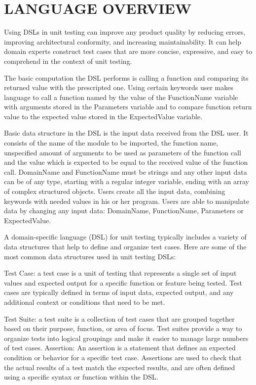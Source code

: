 \chapter{LANGUAGE OVERVIEW}

Using DSLs in unit testing can improve any product quality by reducing errors, improving architectural conformity, and increasing maintainability. It can help domain experts construct test cases that are more concise, expressive, and easy to comprehend in the context of unit testing.

The basic computation the DSL performs is calling a function and comparing its returned value with the prescripted one. Using certain keywords user makes language to call a function named by the value of the FunctionName variable with arguments stored in the Parameters variable and to compare function return value to the expected value stored in the ExpectedValue variable.

Basic data structure in the DSL is the input data received from the DSL user. It consists of the name of the module to be imported, the function name, unspecified amount of arguments to be used as parameters of the function call and the value which is expected to be equal to the received value of the function call. DomainName and FunctionName must be strings and any other input data can be of any type, starting with a regular integer variable, ending with an array of complex structured objects. Users create all the input data, combining keywords with needed values in his or her program. Users are able to manipulate data by changing any input data: DomainName, FunctionName, Parameters or ExpectedValue.

A domain-specific language (DSL) for unit testing typically includes a variety of data structures that help to define and organize test cases. Here are some of the most common data structures used in unit testing DSLs:

Test Case: a test case is a unit of testing that represents a single set of input values and expected output for a specific function or feature being tested. Test cases are typically defined in terms of input data, expected output, and any additional context or conditions that need to be met.

Test Suite: a test suite is a collection of test cases that are grouped together based on their purpose, function, or area of focus. Test suites provide a way to organize tests into logical groupings and make it easier to manage large numbers of test cases.
Assertion: An assertion is a statement that defines an expected condition or behavior for a specific test case. Assertions are used to check that the actual results of a test match the expected results, and are often defined using a specific syntax or function within the DSL.

